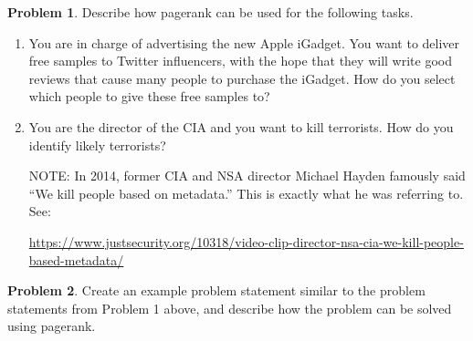 \documentclass[10pt]{exam}
\theoremstyle{definition}
\newtheorem{problem}{Problem}
\newcommand{\x}{\mathbf x}
\newcommand{\ltwo}[1]{{\lVert {#1} \rVert}_2}
\begin{document}
\begin{problem}
    Describe how pagerank can be used for the following tasks.
    \begin{enumerate}
        \item 
            You are in charge of advertising the new Apple iGadget.
            You want to deliver free samples to Twitter influencers,
            with the hope that they will write good reviews that cause many people to purchase the iGadget.
            How do you select which people to give these free samples to?
            \newpage
        \item 
            You are the director of the CIA and you want to kill terrorists.
            How do you identify likely terrorists?


            \vspace{8in}
            NOTE:
            In 2014, former CIA and NSA director Michael Hayden famously said ``We kill people based on metadata.''
            This is exactly what he was referring to.
            See:

            \url{https://www.justsecurity.org/10318/video-clip-director-nsa-cia-we-kill-people-based-metadata/}
    \end{enumerate}
\end{problem}

\newpage
\begin{problem}
    Create an example problem statement similar to the problem statements from Problem 1 above,
    and describe how the problem can be solved using pagerank.
\end{problem}


%
\end{document}
